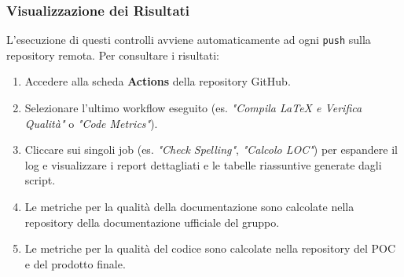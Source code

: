 \documentclass[11pt,a4paper]{article}
\begin{document}
\subsubsection{Visualizzazione dei Risultati}
L'esecuzione di questi controlli avviene automaticamente ad ogni \texttt{push} sulla repository remota. Per consultare i risultati:
\begin{enumerate}
    \item Accedere alla scheda \textbf{Actions} della repository GitHub.
    \item Selezionare l'ultimo workflow eseguito (es. \textit{"Compila LaTeX e Verifica Qualità"} o \textit{"Code Metrics"}).
    \item Cliccare sui singoli job (es. \textit{"Check Spelling"}, \textit{"Calcolo LOC"}) per espandere il log e visualizzare i report dettagliati e le tabelle riassuntive generate dagli script.
    \item Le metriche per la qualità della documentazione sono calcolate nella repository della documentazione ufficiale del gruppo.
    \item Le metriche per la qualità del codice sono calcolate nella repository del POC e del prodotto finale.
\end{enumerate}
\end{document}

